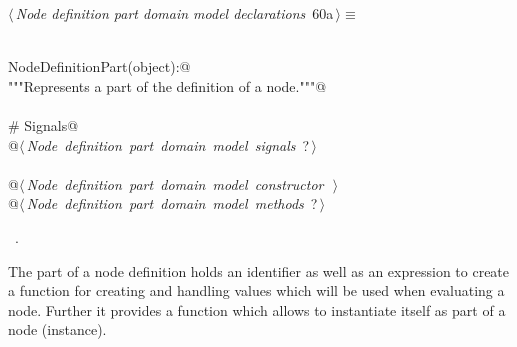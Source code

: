 \documentclass[
    a4paper,      %
    10pt,         %
    openright,    %
    notitlepage,  %
    parskip=half, %
]{scrreprt}       %
\theoremstyle{definition}                    %
\begin{document}
\begin{flushleft} \small
\begin{minipage}{\linewidth}\label{scrap100}\raggedright\small
{} $\langle\,${\itshape Node definition part domain model declarations}\nobreak\ {\footnotesize {60a}}$\,\rangle\equiv$
\vspace{-1exm}
\begin{list}{}{} \item
\mbox{}\lstinline@@\\
\mbox{}\lstinline@class NodeDefinitionPart(object):@\\
\mbox{}\lstinline@    """Represents a part of the definition of a node."""@\\
\mbox{}\lstinline@@\\
\mbox{}\lstinline@    # Signals@\\
\mbox{}\lstinline@    @\hbox{$\langle\,${\itshape Node definition part domain model signals}\nobreak\ {\footnotesize ?}$\,\rangle$}\lstinline@@\\
\mbox{}\lstinline@@\\
\mbox{}\lstinline@    @\hbox{$\langle\,${\itshape Node definition part domain model constructor}\nobreak\ {\footnotesize {}}$\,\rangle$}\lstinline@@\\
\mbox{}\lstinline@    @\hbox{$\langle\,${\itshape Node definition part domain model methods}\nobreak\ {\footnotesize ?}$\,\rangle$}\lstinline@@{\NWsep}
\end{list}
\vspace{-1.5ex}
\footnotesize
\begin{list}{}{\setlength{\itemsep}{-\parsep}\setlength{\itemindent}{-\leftmargin}}
\item \NWtxtMacroRefIn\ .

\item{}
\end{list}
\end{minipage}\vspace{4ex}
\end{flushleft}
The part of a node definition holds an identifier as well as an expression to
create a function for creating and handling values which will be used when
evaluating a node. Further it provides a function which allows to instantiate
itself as part of a node (instance).
\end{document}
